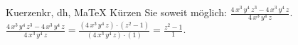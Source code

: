 \begin{MAufgabe}{Kuerzen}{kr, dh, MaTeX}
K\"urzen Sie soweit m\"oglich: $\frac{4\, x^3\, y^4\, z^3 - 4\, x^3\, y^4\, z}{4\, x^3\, y^4\, z}$.\\ 
\ifLsg\MLoesung
\quad $\frac{4\, x^3\, y^4\, z^3 - 4\, x^3\, y^4\, z}{4\, x^3\, y^4\, z}=\frac{(4\, x^3\, y^4\, z)\cdot(z^2 - 1)}{(4\, x^3\, y^4\, z)\cdot(1)}=\frac{z^2 - 1}{1}$.\else\relax\fi
 \end{MAufgabe}